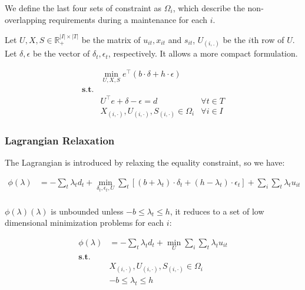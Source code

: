 \documentclass[../main]{subfiles}
\begin{document}
We define the last four sets of constraint as \(\Omega_i\), which
describe the non-overlapping requirements during a maintenance for each
\(i\).

Let \(U, X, S \in \mathbb R^{|I|\times |T|}_+\) be the matrix of
\(u_{it}, x_{it}\) and \(s_{it}\), \(U_{(i,.)}\) be the \(i\)th row of
\(U\). Let \(\delta, \epsilon\) be the vector of
\(\delta_t, \epsilon_t\), respectively. It allows a more compact
formulation.

\[\begin{aligned}
                  & \min_{U, X, S}  e^\top (b\cdot  \delta + h \cdot \epsilon)                   \\
    \mathbf{s.t.} &                                                                              \\
                  & U^\top e + \delta - \epsilon = d                           & \forall t \in T \\
                  & X_{(i,\cdot)}, U_{(i,\cdot)}, S_{(i,\cdot)} \in \Omega_i   & \forall i \in I
  \end{aligned}\]



\hypertarget{lagrangian-relaxation}{%
  \subsubsection{Lagrangian Relaxation}\label{lagrangian-relaxation}}

The Lagrangian is introduced by relaxing the equality constraint, so we
have:

\[\begin{aligned}
    \phi(\lambda) & = - \sum_t \lambda_t d_t + \min_{\delta_t, \epsilon_t, U} \sum_t \left [ (b + \lambda_t) \cdot \delta_t + (h-\lambda_t)\cdot \epsilon_t \right ] + \sum_i \sum_t\lambda_t u_{it} \\
  \end{aligned}\]

\(\phi(\lambda)(\lambda)\) is unbounded unless
\(-b \le \lambda_t \le h\), it reduces to a set of low dimensional
minimization problems for each \(i\):

\[\begin{aligned}
    \phi(\lambda)   & = - \sum_t \lambda_t d_t  + \min_{U}\sum_i \sum_t\lambda_t u_{it} \\
    \mathbf {s.t. } &                                                                   \\
                    & X_{(i,\cdot)}, U_{(i,\cdot)}, S_{(i,\cdot)} \in \Omega_i          \\
                    & -b \le \lambda_t \le h
  \end{aligned}\]
\end{document}
